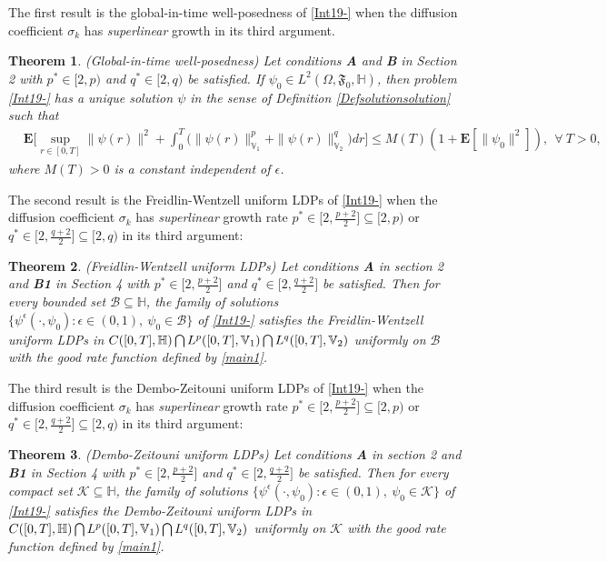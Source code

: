\documentclass[11pt]{article}
\renewcommand{\leq}{\leqslant}
\newtheorem{theorem}{Theorem}[section]
\numberwithin{equation}{section}
\begin{document}
The first result is the global-in-time well-posedness of \eqref{Int19-}
when the diffusion coefficient $\sigma_k$ has
 \emph{superlinear} growth
  in its third argument.


\begin{theorem}\label{Theorem4}(Global-in-time well-posedness)
Let conditions {\bf A} and {\bf B}
in Section 2 with $p^*\in[2,p)$ and $q^*\in[2,q)$ be satisfied.
If $\psi_0\in L^{2}(\Omega,\mathfrak{F}_0,\mathbb{H})$, then problem \eqref{Int19-} has a unique solution $\psi$ in the sense of Definition \ref{Defsolutionsolution} such that
\begin{align}\label{G8}
&
\mathbf{E}\bigg[\sup_{r\in[0,T]}\|\psi
(r)
\|^{2}
+\int_{0}^{T}\Big(\|\psi(r)
\|_{\mathbb{V}_1}^{p} +\|\psi(r)\|^q_{\mathbb{V}_2}\Big)
 dr\bigg]\leq M(T) (1+\mathbf{E}[\|\psi_0\|^2]),\ \ \forall\ T>0,
\end{align}
where $M(T)>0$ is a constant independent of $\epsilon$.
\end{theorem}

The second result is the Freidlin-Wentzell uniform LDPs of \eqref{Int19-} when the diffusion coefficient $\sigma_k$ has  \emph{superlinear} growth rate $p^*\in\big[2,\frac{p+2}{2}\big]\subseteq[2,p)$ or
$q^*\in\big[2,\frac{q+2}{2}\big]\subseteq[2,q)$ in its third argument:
\begin{theorem}\label{MianI}
(Freidlin-Wentzell uniform LDPs) Let conditions  {\bf A}
in section 2  and {\bf B1}
in Section 4    with $p^*\in\big[2,\frac{p+2}{2}\big]$ and $q^*\in\big[2,\frac{q+2}{2}\big]$
be satisfied. Then for every bounded set $\mathcal{B}\subseteq \mathbb{H}$, the family of solutions
$\{\psi^\epsilon(\cdot,\psi_0): \epsilon\in(0,1),\ \psi_0\in \mathcal{B}\}$ of \eqref{Int19-}
satisfies the Freidlin-Wentzell uniform LDPs in $C([0,T],\mathbb{H} )\bigcap\\ L^p([0,T], \mathbb{V}_1  )\bigcap L^q([0,T], \mathbb{V}_2)$ uniformly on $\mathcal{B}$ with the good rate function defined by \eqref{main1}.
\end{theorem}


The third result is the Dembo-Zeitouni uniform LDPs of \eqref{Int19-}
when the diffusion coefficient $\sigma_k$ has  \emph{superlinear} growth rate
 $p^*\in\big[2,\frac{p+2}{2}\big]\subseteq[2,p)$
 or
 $q^*\in\big[2,\frac{q+2}{2}\big]\subseteq[2,q)$ in its third argument:
\begin{theorem}\label{MianII}
(Dembo-Zeitouni uniform LDPs) Let conditions  {\bf A}
in section 2  and {\bf B1}
in Section 4  with $p^*\in\big[2,\frac{p+2}{2}\big]$ and $q^*\in\big[2,\frac{q+2}{2}\big]$
be satisfied.
Then for every compact set $\mathcal{K}\subseteq \mathbb{H}$, the family of solutions
$\{\psi^\epsilon(\cdot,\psi_0): \epsilon\in(0,1),\ \psi_0\in \mathcal{K}\}$ of \eqref{Int19-}
satisfies the Dembo-Zeitouni uniform LDPs in $C([0,T],\mathbb{H} )\bigcap L^p([0,T], \mathbb{V}_1  )\bigcap \\ L^q([0,T], \mathbb{V}_2)$ uniformly on $\mathcal{K}$ with the good rate function defined by \eqref{main1}.
\end{theorem}
\end{document}
